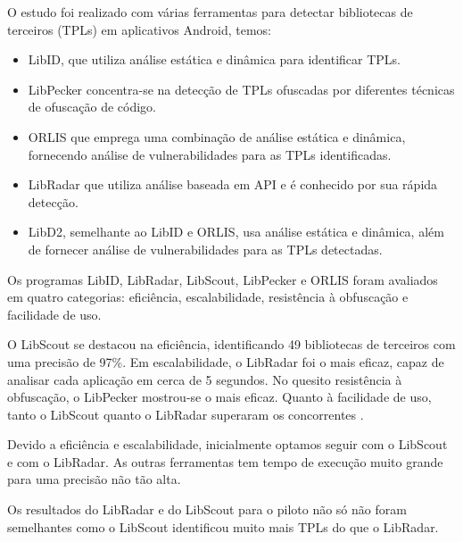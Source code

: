 
O estudo foi realizado com várias ferramentas para detectar bibliotecas de terceiros (TPLs) em aplicativos Android, temos: 
\begin{itemize}
  \item LibID, que utiliza análise estática e dinâmica para identificar TPLs. 
  \item LibPecker concentra-se na detecção de TPLs ofuscadas por diferentes técnicas de ofuscação de código. 
  \item ORLIS que emprega uma combinação de análise estática e dinâmica, fornecendo análise de vulnerabilidades para as TPLs identificadas. 
  \item LibRadar que utiliza análise baseada em API e é conhecido por sua rápida detecção. 
  \item LibD2, semelhante ao LibID e ORLIS, usa análise estática e dinâmica, além de fornecer análise de vulnerabilidades para as TPLs detectadas. 
\end{itemize}
  
Os programas LibID, LibRadar, LibScout, LibPecker e ORLIS foram avaliados em quatro categorias: eficiência, escalabilidade, resistência à obfuscação e facilidade de uso. 

O LibScout se destacou na eficiência, identificando 49 bibliotecas de terceiros com uma precisão de 97\%. 
Em escalabilidade, o LibRadar foi o mais eficaz, capaz de analisar cada aplicação em cerca de 5 segundos. 
No quesito resistência à obfuscação, o LibPecker mostrou-se o mais eficaz. 
Quanto à facilidade de uso, tanto o LibScout quanto o LibRadar superaram os concorrentes \cite{api_tpl_zhang}.

Devido a eficiência e escalabilidade, inicialmente optamos seguir com o LibScout e com o LibRadar. As outras ferramentas tem tempo de execução muito grande para uma precisão não tão alta.

Os resultados do LibRadar e do LibScout para o piloto não só não foram semelhantes como o LibScout identificou muito mais TPLs do que o LibRadar.


